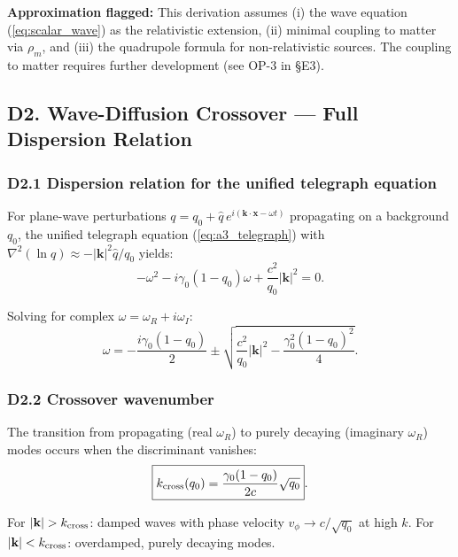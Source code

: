 \documentclass[reprint]{revtex4-2}
\begin{document}
\textbf{Approximation flagged:} This derivation assumes (i) the wave equation (\ref{eq:scalar_wave}) as the relativistic extension, (ii) minimal coupling to matter via $\rho_m$, and (iii) the quadrupole formula for non-relativistic sources. The coupling to matter requires further development (see OP-3 in \S E3).

\subsection{D2. Wave-Diffusion Crossover --- Full Dispersion Relation}

\subsubsection{D2.1 Dispersion relation for the unified telegraph equation}

For plane-wave perturbations $q = q_0 + \hat{q}\,e^{i(\mathbf{k}\cdot\mathbf{x} - \omega t)}$ propagating on a background $q_0$, the unified telegraph equation (\ref{eq:a3_telegraph}) with $\nabla^2(\ln q) \approx -|\mathbf{k}|^2\hat{q}/q_0$ yields:
\begin{equation}
-\omega^2 - i\gamma_0(1-q_0)\omega + \frac{c^2}{q_0}|\mathbf{k}|^2 = 0.
\label{eq:full_dispersion}
\end{equation}

Solving for complex $\omega = \omega_R + i\omega_I$:
\begin{equation}
\omega = -\frac{i\gamma_0(1-q_0)}{2} \pm \sqrt{\frac{c^2}{q_0}|\mathbf{k}|^2 - \frac{\gamma_0^2(1-q_0)^2}{4}}.
\label{eq:omega_complex}
\end{equation}

\subsubsection{D2.2 Crossover wavenumber}

The transition from propagating (real $\omega_R$) to purely decaying (imaginary $\omega_R$) modes occurs when the discriminant vanishes:
\begin{equation}
\boxed{k_{\rm cross}(q_0) = \frac{\gamma_0(1-q_0)}{2c}\sqrt{q_0}}.
\label{eq:kcross_q0}
\end{equation}

For $|\mathbf{k}| > k_{\rm cross}$: damped waves with phase velocity $v_\phi \to c/\sqrt{q_0}$ at high $k$. For $|\mathbf{k}| < k_{\rm cross}$: overdamped, purely decaying modes.
\end{document}

